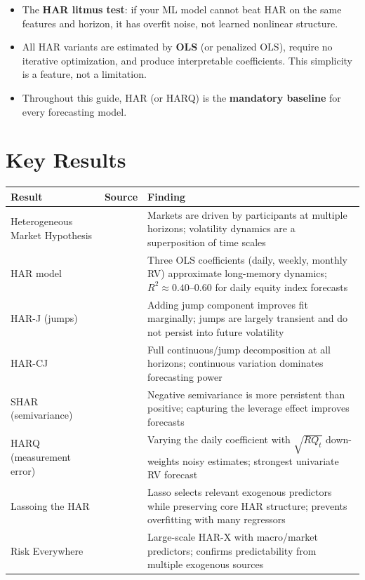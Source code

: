 \begin{itemize}[nosep]
  \item The \textbf{HAR litmus test}: if your ML model cannot beat HAR on the same features and horizon, it has overfit noise, not learned nonlinear structure.

  \item All HAR variants are estimated by \textbf{OLS} (or penalized OLS), require no iterative optimization, and produce interpretable coefficients. This simplicity is a feature, not a limitation.

  \item Throughout this guide, HAR (or HARQ) is the \textbf{mandatory baseline} for every forecasting model.
\end{itemize}


\section*{Key Results}

\begin{center}
\renewcommand{\arraystretch}{1.3}
\begin{tabular}{@{} p{3.5cm} l p{6.5cm} @{}}
\toprule
\textbf{Result} & \textbf{Source} & \textbf{Finding} \\
\midrule
Heterogeneous Market Hypothesis
  & \citet{Muller1993}
  & Markets are driven by participants at multiple horizons;
    volatility dynamics are a superposition of time scales \\[4pt]
HAR model
  & \citet{Corsi2009}
  & Three OLS coefficients (daily, weekly, monthly RV) approximate
    long-memory dynamics; $R^2 \approx 0.40$--$0.60$ for daily equity
    index forecasts \\[4pt]
HAR-J (jumps)
  & \citet{ABD2007}
  & Adding jump component improves fit marginally; jumps are
    largely transient and do not persist into future volatility \\[4pt]
HAR-CJ
  & \citet{CorsiPirinoReno2010}
  & Full continuous/jump decomposition at all horizons;
    continuous variation dominates forecasting power \\[4pt]
SHAR (semivariance)
  & \citet{PSS2015}
  & Negative semivariance is more persistent than positive;
    capturing the leverage effect improves forecasts \\[4pt]
HARQ (measurement error)
  & \citet{BPQ2016}
  & Varying the daily coefficient with $\sqrt{RQ_t}$ down-weights
    noisy estimates; strongest univariate RV forecast \\[4pt]
Lassoing the HAR
  & \citet{AudrinoKnaus2016}
  & Lasso selects relevant exogenous predictors while preserving
    core HAR structure; prevents overfitting with many regressors \\[4pt]
Risk Everywhere
  & \citet{BollerslevEtAl2018}
  & Large-scale HAR-X with macro/market predictors; confirms
    predictability from multiple exogenous sources \\
\bottomrule
\end{tabular}
\end{center}

